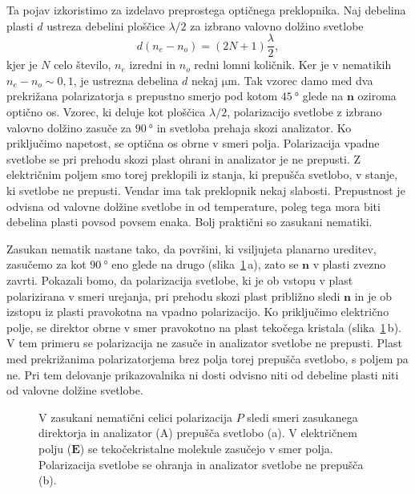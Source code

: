 Ta pojav izkoristimo za izdelavo preprostega optičnega preklopnika. 
Naj debelina plasti $d$ ustreza debelini ploščice $\lambda/2$ 
za izbrano valovno dolžino svetlobe 
\begin{equation}
d(n_{e}-n_{o})=(2N+1)\frac{\lambda}{2},
\label{7.57}
\end{equation}
kjer je $N$ celo število, $n_e$ izredni in $n_o$ redni 
lomni količnik. Ker je v nematikih $n_{e}-n_{o}\sim0,1$, 
je ustrezna debelina $d$ nekaj $\si{\micro\metre}$. Tak vzorec damo med dva prekrižana 
polarizatorja s prepustno smerjo pod kotom $45~\si{\degree}$ glede na $\mathbf{n}$
oziroma optično os. Vzorec, ki deluje kot ploščica $\lambda/2$, 
polarizacijo svetlobe z izbrano valovno dolžino zasuče za $90~\si{\degree}$ in 
svetloba prehaja skozi analizator. Ko
priključimo napetost, se optična os obrne v smeri polja. Polarizacija vpadne 
svetlobe se pri prehodu skozi plast ohrani in 
analizator je ne prepusti. Z električnim poljem smo torej preklopili iz
stanja, ki prepušča svetlobo, v stanje, ki svetlobe ne prepusti.
Vendar ima tak preklopnik nekaj slabosti. Prepustnost je odvisna
od valovne dolžine svetlobe in od temperature, poleg tega mora biti debelina 
plasti povsod povsem enaka. Bolj praktični so zasukani nematiki. 

Zasukan  nematik nastane tako, da površini, ki vsiljujeta planarno ureditev,
zasučemo za kot $90~\si{\degree}$ eno glede na drugo (slika~\ref{LCD1}\,a), zato se $\mathbf{n}$ 
v plasti zvezno zavrti.
Pokazali bomo, da polarizacija svetlobe, ki je ob vstopu 
v plast polarizirana v smeri urejanja, pri prehodu skozi plast približno
sledi $\mathbf{n}$ in je ob izstopu iz plasti pravokotna
na vpadno polarizacijo. Ko priključimo električno polje, se direktor 
obrne v smer pravokotno na plast tekočega kristala (slika~\ref{LCD1}\,b). V tem primeru 
se polarizacija ne zasuče in analizator svetlobe ne prepusti. Plast med prekrižanima
polarizatorjema brez polja torej prepušča svetlobo, s poljem pa ne. Pri tem
delovanje prikazovalnika ni dosti odvisno niti od debeline plasti niti
od valovne dolžine svetlobe. 
\begin{figure}[h!]
\centering
\def\svgwidth{100truemm} 

\caption{V zasukani nematični celici polarizacija $P$ sledi smeri zasukanega 
direktorja in analizator (A) prepušča svetlobo (a). V električnem polju 
($\mathbf{E}$) se tekočekristalne molekule zasučejo v smer polja. 
Polarizacija svetlobe se ohranja in analizator svetlobe ne prepušča (b).}
\label{LCD1}
\end{figure}

